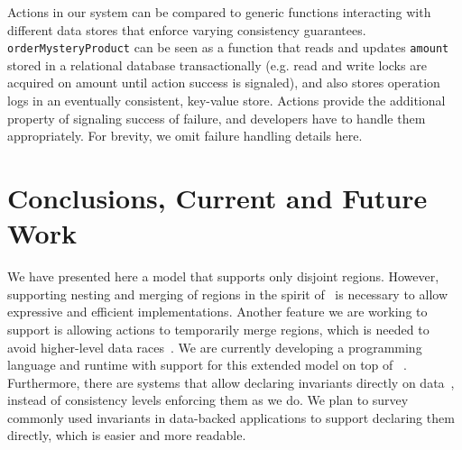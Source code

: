 \documentclass[preprint,numbers]{sigplanconf}
\begin{document}
Actions in our system can be compared to generic functions interacting
with different data stores that enforce varying consistency guarantees.
\texttt{orderMysteryProduct} can be seen as a function that
reads and updates \texttt{amount} stored in a relational database
transactionally (e.g. read and write locks are acquired on amount until
action success is signaled), and also stores operation logs in an eventually consistent,
key-value store. Actions provide the additional property of signaling success
of failure, and developers have to handle them appropriately. For brevity, we omit failure handling details here.

\section{Conclusions, Current and Future Work}
We have presented here a model that supports only disjoint regions. However, supporting
nesting and merging of regions in the spirit of~\cite{dolby2012data} is necessary to allow expressive and efficient 
implementations. Another feature we are working to support is allowing actions to temporarily merge regions, which
is needed to avoid higher-level data races~\cite{artho2003high}. We are
currently developing a programming language and runtime with support for this extended model
on top of ~\cite{burckhardt2012cloud}. Furthermore, there are systems
that allow declaring invariants directly on data~\cite{bailis2015feral}, instead of 
consistency levels enforcing them as we do. We plan to survey commonly used
invariants in data-backed applications to support declaring them directly, which
is easier and more readable.








\end{document}
